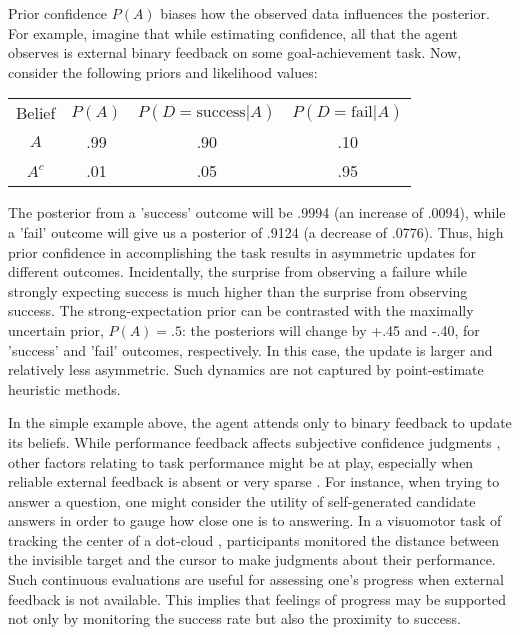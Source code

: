 Prior confidence $P(A)$ biases how the observed data influences the posterior. For example, imagine that while estimating confidence, all that the agent observes is external binary feedback on some goal-achievement task. Now, consider the following priors and likelihood values:
\begin{center}
\begin{tabular}{c c c c}
Belief & $P(A)$ & $P(D=\mathrm{success}|A)$ & $P(D=\mathrm{fail}|A)$ \\ 
$A$    & .99    & .90                       & .10        \\  
$A^c$  & .01    & .05                       & .95         
\end{tabular}
\end{center}
The posterior from a 'success' outcome will be .9994 (an increase of .0094), while a 'fail' outcome will give us a posterior of .9124 (a decrease of .0776). Thus, high prior confidence in accomplishing the task results in asymmetric updates for different outcomes. Incidentally, the surprise from observing a failure while strongly expecting success is much higher than the surprise from observing success. The strong-expectation prior can be contrasted with the maximally uncertain prior, $P(A) = .5$: the posteriors will change by +.45 and -.40, for 'success' and 'fail' outcomes, respectively. In this case, the update is larger and relatively less asymmetric. Such dynamics are not captured by point-estimate heuristic methods. 

In the simple example above, the agent attends only to binary feedback to update its beliefs. While performance feedback affects subjective confidence judgments \cite{marti_certainty_2018,rouault_forming_2019}, other factors relating to task performance might be at play, especially when reliable external feedback is absent or very sparse \cite[e.g.,][]{rouault_forming_2019,holm_episodic_2019,locke_performance_2020}. For instance, when trying to answer a question, one might consider the utility of self-generated candidate answers \cite{coenen_asking_2019} in order to gauge how close one is to answering. In a visuomotor task of tracking the center of a dot-cloud \cite{locke_performance_2020}, participants monitored the distance between the invisible target and the cursor to make judgments about their performance. Such continuous evaluations are useful for assessing one's progress when external feedback is not available. This implies that feelings of progress may be supported not only by monitoring the success rate but also the proximity to success.

